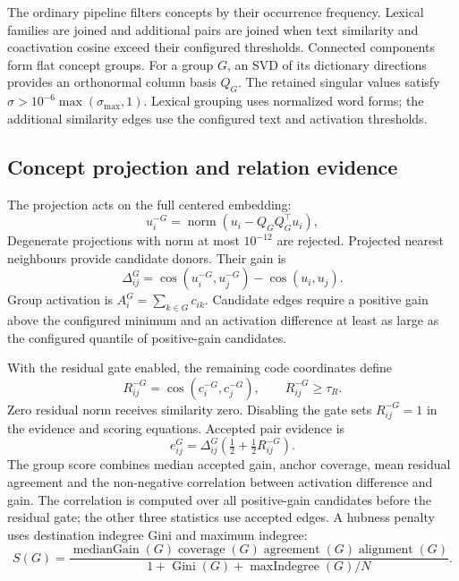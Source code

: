 \documentclass[11pt,a4paper]{article}
\begin{document}
The ordinary pipeline filters concepts by their occurrence frequency. Lexical
families are joined and additional pairs are joined when text similarity and
coactivation cosine exceed their configured thresholds. Connected components
form flat concept groups. For a group $G$, an SVD of its dictionary directions
provides an orthonormal column basis $Q_G$. The retained singular values satisfy
$\sigma>10^{-6}\max(\sigma_{\max},1)$.
Lexical grouping uses normalized word forms; the additional similarity edges
use the configured text and activation thresholds.

\subsection{Concept projection and relation evidence}
The projection acts on the full centered embedding:
\begin{equation}
 u_i^{-G}=\operatorname{norm}\!\left(u_i-Q_GQ_G^\top u_i\right),
 \label{eq:projection}
\end{equation}
Degenerate projections with norm at most $10^{-12}$ are rejected. Projected
nearest neighbours provide candidate donors. Their gain is
\begin{equation}
 \Delta_{ij}^{G}=\cos(u_i^{-G},u_j^{-G})-\cos(u_i,u_j).
\end{equation}
Group activation is $A_i^G=\sum_{k\in G}c_{ik}$. Candidate edges require a positive
gain above the configured minimum and an activation difference at least as large as the
configured quantile of positive-gain candidates.

With the residual gate enabled, the remaining code coordinates define
\begin{equation}
 R_{ij}^{-G}=\cos(c_i^{-G},c_j^{-G}),\qquad R_{ij}^{-G}\geq\tau_R.
\end{equation}
Zero residual norm receives similarity zero. Disabling the gate sets
$R_{ij}^{-G}=1$ in the evidence and scoring equations. Accepted pair evidence is
\begin{equation}
 e_{ij}^{G}=\Delta_{ij}^{G}\left(\tfrac12+\tfrac12R_{ij}^{-G}\right).
\end{equation}
The group score combines median accepted gain, anchor coverage, mean residual
agreement and the non-negative correlation between activation difference and gain.
The correlation is computed over all positive-gain candidates before the residual
gate; the other three statistics use accepted edges.
A hubness penalty uses destination indegree Gini and maximum indegree:
\begin{equation}
 S(G)=\frac{\operatorname{medianGain}(G)\operatorname{coverage}(G)
 \operatorname{agreement}(G)\operatorname{alignment}(G)}
 {1+\operatorname{Gini}(G)+\operatorname{maxIndegree}(G)/N}.
\end{equation}
\end{document}
